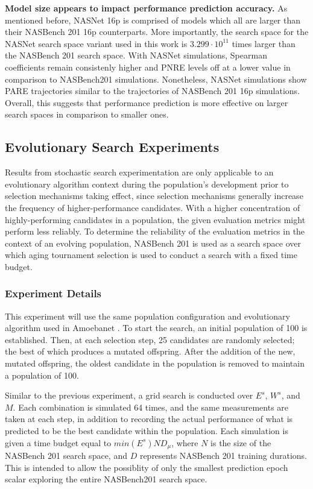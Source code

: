 \documentclass[twocolumn]{article}
\begin{document}
\textbf{Model size appears to impact performance prediction accuracy.} 
As mentioned before, NASNet 16p is comprised of models which all are larger than their NASBench 201 16p counterparts.
More importantly, the search space for the NASNet search space variant used in this work is $3.299\cdot10^{11}$ times larger than the NASBench 201 search space.
With NASNet simulations, Spearman coefficients remain consistenly higher and PNRE levels off at a lower value in comparison to NASBench201 simulations.
Nonetheless, NASNet simulations show PARE trajectories similar to the trajectories of NASBench 201 16p simulations.
Overall, this suggests that performance prediction is more effective on larger search spaces in comparison to smaller ones.

\subsection{Evolutionary Search Experiments}

Results from stochastic search experimentation are only applicable to an evolutionary algorithm context during the population's development prior to 
selection mechanisms taking effect, since selection mechanisms generally increase the frequency of higher-performance candidates. 
With a higher concentration of highly-performing candidates in a population, the given evaluation metrics might perform less reliably.
To determine the reliability of the evaluation metrics in the context of an evolving population, NASBench 201 is used as a search space
over which aging tournament selection \cite{amoebanet} is used to conduct a search with a fixed time budget.

\subsubsection{Experiment Details}

This experiment will use the same population configuration and evolutionary algorithm used in Amoebanet \cite{amoebanet}.
To start the search, an initial population of 100 is established.
Then, at each selection step, 25 candidates are randomly selected; the best of which produces a mutated offspring.
After the addition of the new, mutated offspring, the oldest candidate in the population is removed to maintain a population of 100.

Similar to the previous experiment, a grid search is conducted over $E^s$, $W^s$, and $M$.
Each combination is simulated 64 times, and the same measurements are taken at each step, in addition to recording the actual performance of what is predicted to be the
best candidate within the population.
Each simulation is given a time budget equal to $min(E^{s})ND_{\mu}$, where $N$ is the size of the NASBench 201 search space, and $D$ represents NASBench 201 training durations.
This is intended to allow the possiblity of only the smallest prediction epoch scalar exploring the entire NASBench201 search space.
\end{document}
